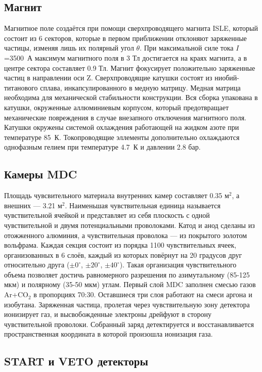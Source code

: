 \subsection{ Магнит }

Магнитное поле создаётся при помощи сверхпроводящего магнита ISLE, который состоит из 6 секторов, которые в первом приближении отклоняют заряженные частицы, изменяя лишь их полярный угол $\theta$.
При максимальной силе тока $I$=3500~А максимум магнитного поля в 3 Тл достигается на краях магнита, а в центре сектора составляет 0.9 Тл.
Магнит фокусирует положительно заряженные частиц в направлении оси Z.
Сверхпроводящие катушки состоят из ниобий-титанового сплава, инкапсулированного в медную матрицу.
Медная матрица необходима для механической стабильности конструкции.
Вся сборка упакована в катушки, окруженные аллюминиевым корпусом, который предотвращает механические повреждения в случае внезапного отключения магнитного поля.
Катушки окружены системой охлаждения работающей на жидком азоте при температуре 85~К.
Токопроводящие эллементы дополнительно охлаждаются однофазным гелием при температуре 4.7~К и давлении 2.8 бар.

\subsection{ Камеры MDC }

Площадь чувсвительного материала внутренних камер составляет 0.35 м$^2$, а внешних --- 3.21 м$^2$.
Наименьшая чувствительная единица называется чувствительной ячейкой и представляет из себя плоскость с одной чувствительной и двумя потенциальными проволоками.
Катод и анод сделаны из отожженного алюминия, а чувствительная проволока --- из покрытого золотом вольфрама.
Каждая секция состоит из порядка 1100 чувствительных ячеек, организованных в 6 слоёв, каждый из которых повёрнут на 20 градусов друг относительно друга ($\pm0^{\circ}$, $\pm20^{\circ}$, $\pm40^{\circ}$).
Такая организация чувствительного объема позволяет достичь равномерного разрешения по азимутальному (85-125 мкм) и полярному (35-50 мкм) углам.
Первый слой MDC заполнен смесью газов Ar+CO$_{2}$ в пропорциях 70:30.
Оставшиеся три слоя работают на смеси аргона и изобутана. 
Заряженная частица, пролетая через чувствительную зону детектора ионизирует газ, и высвобожденные электроны дрейфуют в сторону чувствительной проволоки.
Собранный заряд детектируется и восстанавливается пространственная координата в которой произошла ионизация газа.

\subsection{START и VETO детекторы}

